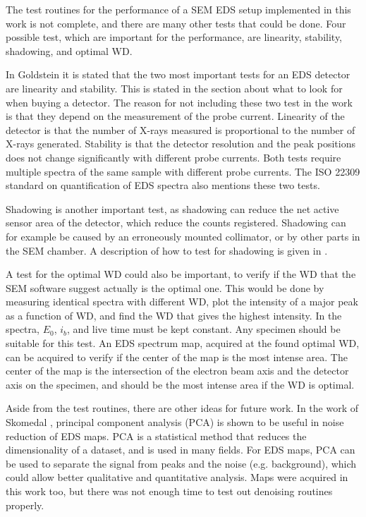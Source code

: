 The test routines for the performance of a SEM EDS setup implemented in this work is not complete, and there are many other tests that could be done.
Four possible test, which are important for the performance, are linearity, stability, shadowing, and optimal WD.

In Goldstein \cite[p. 232]{goldstein_scanning_2018} it is stated that the two most important tests for an EDS detector are linearity and stability.
This is stated in the section about what to look for when buying a detector.
The reason for not including these two test in the work is that they depend on the measurement of the probe current.
Linearity of the detector is that the number of X-rays measured is proportional to the number of X-rays generated.
Stability is that the detector resolution and the peak positions does not change significantly with different probe currents.
Both tests require multiple spectra of the same sample with different probe currents.
The ISO 22309 standard on quantification of EDS spectra \cite{iso_quantification_22309} also mentions these two tests.

Shadowing is another important test, as shadowing can reduce the net active sensor area of the detector, which reduce the counts registered.
Shadowing can for example be caused by an erroneously mounted collimator, or by other parts in the SEM chamber.
A description of how to test for shadowing is given in \cite{shadowing_procop_2016}.

A test for the optimal WD could also be important, to verify if the WD that the SEM software suggest actually is the optimal one.
This would be done by measuring identical spectra with different WD, plot the intensity of a major peak as a function of WD, and find the WD that gives the highest intensity.
In the spectra, $E_0$, $i_b$, and live time must be kept constant.
Any specimen should be suitable for this test.
An EDS spectrum map, acquired at the found optimal WD, can be acquired to verify if the center of the map is the most intense area.
The center of the map is the intersection of the electron beam axis and the detector axis on the specimen, and should be the most intense area if the WD is optimal.


Aside from the test routines, there are other ideas for future work.
In the work of Skomedal \cite{skomedal_improving_2022}, principal component analysis (PCA) is shown to be useful in noise reduction of EDS maps.
PCA is a statistical method that reduces the dimensionality of a dataset, and is used in many fields.
For EDS maps, PCA can be used to separate the signal from peaks and the noise (e.g. background), which could allow better qualitative and quantitative analysis.
Maps were acquired in this work too, but there was not enough time to test out denoising routines properly.


